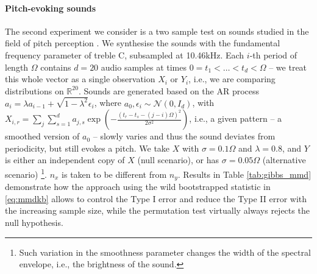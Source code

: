 \paragraph{Pitch-evoking sounds}
The second experiment we consider is a two sample test on sounds studied in the field of pitch perception \cite{hehrmannthesis}. We synthesise the sounds with the fundamental frequency
parameter of treble C, subsampled at 10.46kHz. Each $i$-th period
of length $\Omega$ contains $d=20$ audio samples at times $0=t_{1}<\ldots<t_{d}<\Omega$
-- we treat this whole vector as a single observation $X_{i}$ or
$Y_{i}$, i.e., we are comparing distributions on $\mathbb{R}^{20}$.
Sounds are generated based on the AR process $a_{i}=\lambda a_{i-1}+\sqrt{1-\lambda^{2}}\epsilon_{i}$,
where $a_{0},\epsilon_{i}\sim\mathcal{N}(0,I_{d})$, with $X_{i,r}=\sum_{j}\sum_{s=1}^{d}a_{j,s}\exp\left(-\frac{\left(t_{r}-t_{s}-(j-i)\Omega\right)^{2}}{2\sigma^{2}}\right)$,
i.e., a given pattern -- a smoothed version of $a_{0}$ -- slowly
varies and thus the sound deviates from
periodicity, but still evokes a pitch. We take
$X$ with $\sigma=0.1\Omega$
and $\lambda=0.8$, and $Y$ is either an independent copy of $X$
(null scenario), or has $\sigma=0.05\Omega$ (alternative scenario)%
\footnote{Such variation in the smoothness parameter changes the width of the
spectral envelope, i.e., the brightness of the sound.}. $n_x$ is taken to be different from $n_y$. Results in Table \ref{tab:gibbs_mmd} demonstrate how the
approach using the wild bootstrapped statistic in \eqref{eq:mmdkb} allows to control the Type I error and reduce the Type II error with the increasing sample size, while the permutation test
virtually always rejects the null hypothesis.

% 


